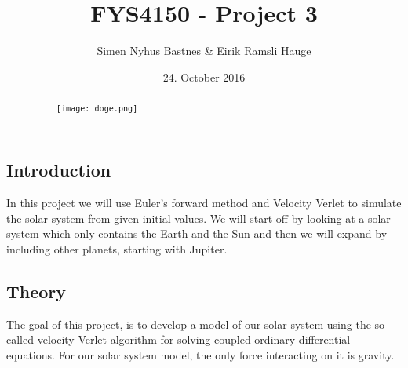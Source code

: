 \documentclass{article}
\title{FYS4150 - Project 3}
\author{Simen Nyhus Bastnes \& Eirik Ramsli Hauge}
\date{24. October 2016}
\begin{document}
\maketitle
\begin{abstract}
\begin{figure}[H]
\centering
\texttt{[image: doge.png]}
\end{figure}
\end{abstract}
\subsection{Introduction}
In this project we will use Euler's forward method and Velocity Verlet to simulate the solar-system from given initial values. We will start off by looking at a solar system which only contains the Earth and the Sun and then we will expand by including other planets, starting with Jupiter.
\subsection{Theory}
The goal of this project, is to develop a model of our solar system using the so-called velocity Verlet algorithm for solving coupled ordinary differential equations. For our solar system model, the only force interacting on it is gravity.
\end{document}
